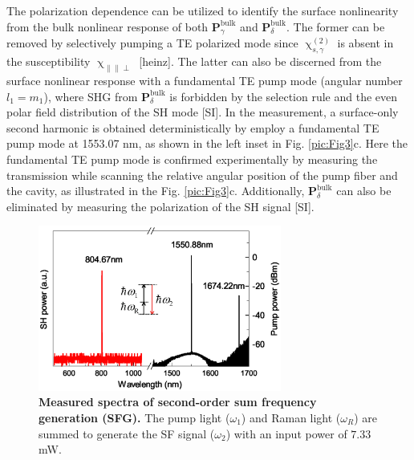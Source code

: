 \documentclass[a4paper,8pt,hyperref, twocolumn]{article}
\begin{document}
The polarization dependence can be utilized to identify the surface nonlinearity from the bulk nonlinear response of both $\mathbf{P}^{\mathrm{bulk}}_\gamma$ and $\mathbf{P}^{\mathrm{bulk}}_\delta$.  %
The former can be removed by selectively pumping a TE polarized mode since $\upchi^{(2)}_{s,\gamma}$ is absent in the susceptibility $\upchi_{\parallel \parallel \perp}$ [heinz]. 
The latter can also be discerned from the surface nonlinear response with a fundamental TE pump mode (angular number $l_1=m_1$), where SHG from $\mathbf{P}^{\mathrm{bulk}}_\delta$ is forbidden by the selection rule and the even polar field distribution of the SH mode [SI]. 
In the measurement, a surface-only second harmonic is obtained deterministically by employ a fundamental TE pump mode at 1553.07 nm, as shown in the left inset in Fig. \ref{pic:Fig3}c.
Here the fundamental TE pump mode is confirmed experimentally by measuring the transmission while scanning the relative angular position of the pump fiber and the cavity, as illustrated in the  Fig. \ref{pic:Fig3}c.
Additionally, $\mathbf{P}^{\mathrm{bulk}}_\delta$ can also be eliminated by measuring the polarization of the SH signal [SI]. %




\begin{figure}[!ht]
\centering
\includegraphics[width=8cm]{Fig4.eps}
\caption{\textbf{Measured spectra of second-order sum frequency generation (SFG). }The pump light ($\omega_1$) and Raman light ($\omega_R$) are summed to generate the SF signal ($\omega_2$) with an input power of $7.33$ mW.}
\label{pic:Fig4}
\end{figure}
\end{document}
